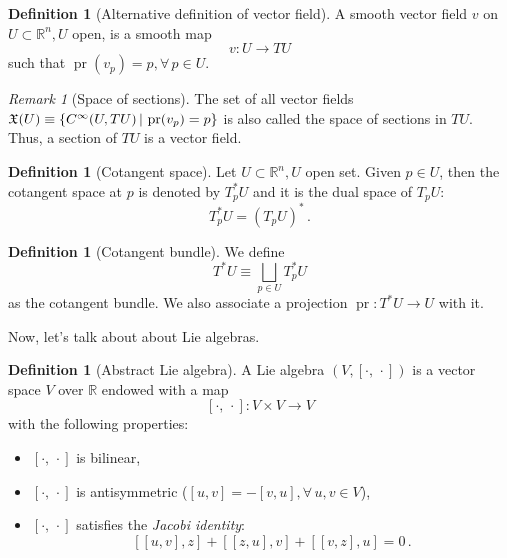 \documentclass[a4paper,11pt,titlepage, article, oneside]{memoir}
\numberwithin{equation}{section}
\theoremstyle{definition}
\newtheorem{definition}[theorem]{Definition}
\theoremstyle{remark}
\newtheorem{remark}[theorem]{Remark}
\DeclareMathOperator{\pr}{pr}
\newcommand{\rfield}{\mathbb{R}}
\begin{document}
\begin{definition}[Alternative definition of vector field]
  A smooth vector field $v$ on $U \subset \rfield^n, U$ open, is a smooth map
  \begin{equation}
    v \colon U \rightarrow TU
  \end{equation}
  such that $\pr(v_p) = p, \forall \, p \in U$.
\end{definition}

\begin{remarkbox}\begin{remark} [Space of sections]
  The set of all vector fields $\mathfrak{X}(U) \equiv \{ C^\infty(U, TU) \, | \\ \, \pr(v_p) = p \}$ is also called the space of sections in $TU$. Thus, a section of $TU$ is a vector field.
\end{remark}\end{remarkbox}

\begin{definition}[Cotangent space] \label{cotangentspace}
Let $U \subset \rfield^n, U$ open set. Given $p \in U$, then the cotangent space at $p$ is denoted by $T_p^* U$ and it is the dual space of $T_pU$:
\[ T_p^* U = (T_p U)^* \, . \]
\end{definition}

\begin{definition} [Cotangent bundle]
  We define
  \begin{equation}
    T^*U \equiv \bigsqcup\limits_{p \in U} T_p^* U
  \end{equation}
  as the cotangent bundle. We also associate a projection $\pr \colon T^*U \rightarrow U$ with it.
\end{definition}

Now, let's talk about about Lie algebras.

\begin{definition}[Abstract Lie algebra]
  A Lie algebra $(V, [\cdot, \, \cdot])$ is a vector space $V$ over $\rfield$ endowed with a map
  $$[\cdot , \, \cdot] \colon V \times V \rightarrow V$$
  with the following properties:
  \begin{itemize}
    \item $[\cdot , \, \cdot]$ is bilinear,
    \item $[\cdot , \, \cdot]$ is antisymmetric ($[u, v] = -[v, u], \forall \, u, v \in V$),
    \item $[\cdot , \, \cdot]$ satisfies the \textit{Jacobi identity}:
    $$[[u, v], z] + [[z, u], v] + [[v, z], u] = 0 \, .$$
  \end{itemize}
\end{definition}
\end{document}
